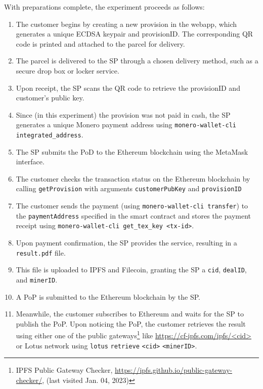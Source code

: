 \documentclass[pdftex,twocolumn,epjc3]{svjour3}
\begin{document}
{With preparations complete, the experiment proceeds as follows:

\begin{enumerate}
  \item The customer begins by creating a new provision in the webapp, which generates a unique ECDSA keypair and provisionID. The corresponding QR code is printed and attached to the parcel for delivery.
  
  \item The parcel is delivered to the SP through a chosen delivery method, such as a secure drop box or locker service.

  \item Upon receipt, the SP scans the QR code to retrieve the provisionID and customer's public key.
  
  \item Since (in this experiment) the provision was not paid in cash, the SP generates a unique Monero payment address using \texttt{monero-wallet-cli integrated\_address}. 
  
  \item The SP submits the PoD to the Ethereum blockchain using the MetaMask interface.

    \item The customer checks the transaction status on the Ethereum blockchain by calling \texttt{getProvision} with arguments \texttt{customerPubKey} and \texttt{provisionID}
    
    \item The customer sends the payment (using \texttt{monero-wallet-cli transfer}) to the \texttt{paymentAddress} specified in the smart contract and stores the payment receipt using \texttt{monero-wallet-cli get\_tex\_key <tx-id>}.
  
    \item Upon payment confirmation, the SP provides the service, resulting in a \texttt{result.pdf} file.

  \item This file is uploaded to IPFS and Filecoin, granting the SP a \texttt{cid}, \texttt{dealID}, and \texttt{minerID}.

  \item A PoP is submitted to the Ethereum blockchain by the SP.

    \item Meanwhile, the customer subscribes to Ethereum and waits for the SP to publish the PoP.
Upon noticing the PoP, the customer retrieves the result using either one of the public gateways\footnote{IPFS Public Gateway Checker, \url{https://ipfs.github.io/public-gateway-checker/}, (last visited Jan. 04, 2023)} like \url{https://cf-ipfs.com/ipfs/<cid>} or Lotus network using \texttt{lotus} \texttt{retrieve} \texttt{<cid>} \texttt{<minerID>}.
 

\end{enumerate}}
\end{document}
